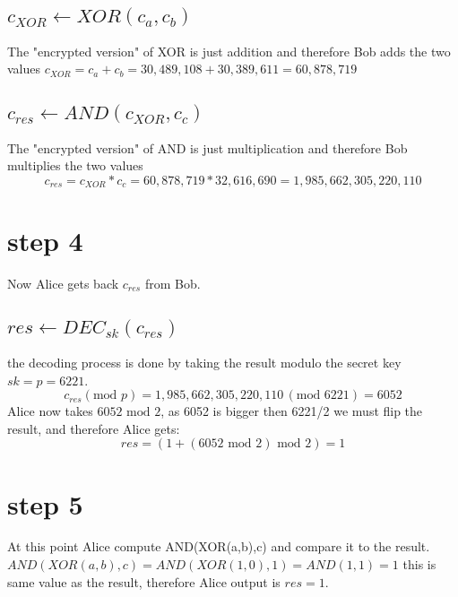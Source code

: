 \documentclass{article}
\begin{document}
\subsection*{$c_{XOR} \leftarrow XOR(c_a,c_b)$}
The "encrypted version" of XOR is just addition and therefore Bob adds the two values
$c_{XOR} = c_a + c_b = 30,489,108 + 30,389,611 = 60,878,719$

\subsection*{$c_{res} \leftarrow AND(c_{XOR},c_c)$}
The "encrypted version" of AND is just multiplication and therefore Bob multiplies the two values
\[c_{res} = c_{XOR} * c_c = 60,878,719 * 32,616,690 
= 1,985,662,305,220,110\]

\section{step 4}
Now Alice gets back $c_{res}$ from Bob.
\subsection*{$res \leftarrow DEC_{sk}(c_{res})$}
the decoding process is done by taking the result modulo the secret key $sk=p=6221$. 
\[
c_{res} (\mathrm{mod } \,\, p) = 1,985,662,305,220,110 \, (\mathrm{mod } \,\,  6221) = 6052
\]
Alice now takes $6052 \,\, \mathrm{mod } \,\, 2$, as 6052 is bigger then 6221/2 we must flip the result, and therefore Alice gets: \[res = (1 + (6052 \,\,  \mathrm{mod } \,\,  2) \,\,\mathrm{mod } \,\,  2) = 1\] 
\section{step 5}
At this point Alice compute AND(XOR(a,b),c) and compare it to the result.
$AND(XOR(a,b),c) = AND(XOR(1,0),1) = AND(1,1) = 1$ this is same value as the result, therefore Alice output is $res = 1$.
\end{document}
